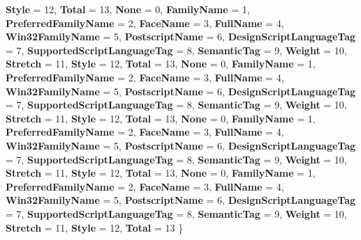 \begin{DoxyCompactItemize}
{\bfseries Style} = 12, 
{\bfseries Total} = 13, 
{\bfseries None} = 0, 
{\bfseries Family\+Name} = 1, 
\newline
{\bfseries Preferred\+Family\+Name} = 2, 
{\bfseries Face\+Name} = 3, 
{\bfseries Full\+Name} = 4, 
{\bfseries Win32\+Family\+Name} = 5, 
\newline
{\bfseries Postscript\+Name} = 6, 
{\bfseries Design\+Script\+Language\+Tag} = 7, 
{\bfseries Supported\+Script\+Language\+Tag} = 8, 
{\bfseries Semantic\+Tag} = 9, 
\newline
{\bfseries Weight} = 10, 
{\bfseries Stretch} = 11, 
{\bfseries Style} = 12, 
{\bfseries Total} = 13, 
\newline
{\bfseries None} = 0, 
{\bfseries Family\+Name} = 1, 
{\bfseries Preferred\+Family\+Name} = 2, 
{\bfseries Face\+Name} = 3, 
\newline
{\bfseries Full\+Name} = 4, 
{\bfseries Win32\+Family\+Name} = 5, 
{\bfseries Postscript\+Name} = 6, 
{\bfseries Design\+Script\+Language\+Tag} = 7, 
\newline
{\bfseries Supported\+Script\+Language\+Tag} = 8, 
{\bfseries Semantic\+Tag} = 9, 
{\bfseries Weight} = 10, 
{\bfseries Stretch} = 11, 
\newline
{\bfseries Style} = 12, 
{\bfseries Total} = 13, 
{\bfseries None} = 0, 
{\bfseries Family\+Name} = 1, 
\newline
{\bfseries Preferred\+Family\+Name} = 2, 
{\bfseries Face\+Name} = 3, 
{\bfseries Full\+Name} = 4, 
{\bfseries Win32\+Family\+Name} = 5, 
\newline
{\bfseries Postscript\+Name} = 6, 
{\bfseries Design\+Script\+Language\+Tag} = 7, 
{\bfseries Supported\+Script\+Language\+Tag} = 8, 
{\bfseries Semantic\+Tag} = 9, 
\newline
{\bfseries Weight} = 10, 
{\bfseries Stretch} = 11, 
{\bfseries Style} = 12, 
{\bfseries Total} = 13, 
\newline
{\bfseries None} = 0, 
{\bfseries Family\+Name} = 1, 
{\bfseries Preferred\+Family\+Name} = 2, 
{\bfseries Face\+Name} = 3, 
\newline
{\bfseries Full\+Name} = 4, 
{\bfseries Win32\+Family\+Name} = 5, 
{\bfseries Postscript\+Name} = 6, 
{\bfseries Design\+Script\+Language\+Tag} = 7, 
\newline
{\bfseries Supported\+Script\+Language\+Tag} = 8, 
{\bfseries Semantic\+Tag} = 9, 
{\bfseries Weight} = 10, 
{\bfseries Stretch} = 11, 
\newline
{\bfseries Style} = 12, 
{\bfseries Total} = 13
 \}
\item 

\end{DoxyCompactItemize}
